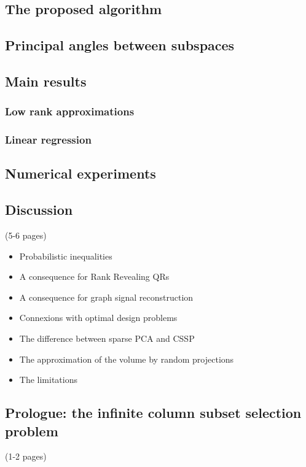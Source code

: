 \documentclass[twoside,11pt]{article}
\begin{document}
\subsection{The proposed algorithm}
\subsection{Principal angles between subspaces}
\subsection{Main results}
\subsubsection{Low rank approximations}
\subsubsection{Linear regression}
\subsection{Numerical experiments}
\subsection{Discussion} (5-6 pages)
\begin{itemize}
\item Probabilistic inequalities
\item A consequence for Rank Revealing QRs
\item A consequence for graph signal reconstruction
\item Connexions with optimal design problems
\item The difference between sparse PCA and CSSP
\item The approximation of the volume by random projections 
\item The limitations 
\end{itemize}
\subsection{Prologue: the infinite column subset selection problem} (1-2 pages)
\end{document}
